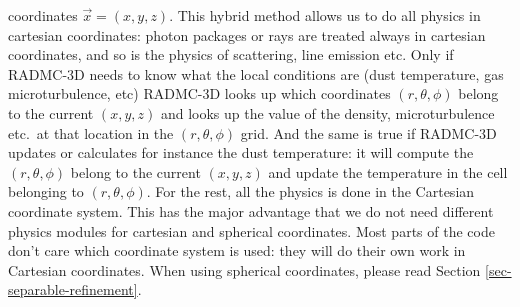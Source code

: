 \documentclass{report}
\begin{document}
\begin{itemize}
  coordinates $\vec x=(x,y,z)$. This hybrid method allows us to do all
  physics in cartesian coordinates: photon packages or rays are treated
  always in cartesian coordinates, and so is the physics of scattering, line
  emission etc.  Only if RADMC-3D needs to know what the local conditions
  are (dust temperature, gas microturbulence, etc) RADMC-3D looks up which
  coordinates $(r,\theta,\phi)$ belong to the current $(x,y,z)$ and looks up
  the value of the density, microturbulence etc.\ at that location in the
  $(r,\theta,\phi)$ grid. And the same is true if RADMC-3D updates or
  calculates for instance the dust temperature: it will compute the
  $(r,\theta,\phi)$ belong to the current $(x,y,z)$ and update the
  temperature in the cell belonging to $(r,\theta,\phi)$. For the rest, all
  the physics is done in the Cartesian coordinate system. This has the major
  advantage that we do not need different physics modules for cartesian and
  spherical coordinates. Most parts of the code don't care which coordinate
  system is used: they will do their own work in Cartesian coordinates.
  When using spherical coordinates, please read Section
  \ref{sec-separable-refinement}.
\end{itemize}
\end{document}
